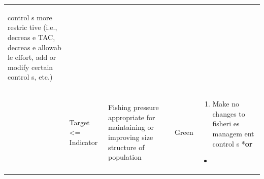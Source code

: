\documentclass[]{book}
\providecommand{\tightlist}{%
  \setlength{\itemsep}{0pt}\setlength{\parskip}{0pt}}
\begin{document}
\begin{longtable}[]{@{}lllll@{}}
\begin{minipage}[t]{0.19\columnwidth}
\begin{enumerate}
  control s more restric tive (i.e., decreas e TAC, decreas e allowab le
  effort, add or modify certain control s, etc.)
\end{enumerate}\strut
\end{minipage}\tabularnewline
\begin{minipage}[t]{0.19\columnwidth}\raggedright\strut
\strut
\end{minipage} & \begin{minipage}[t]{0.19\columnwidth}\raggedright\strut
Target \textless{}= Indicator\strut
\end{minipage} & \begin{minipage}[t]{0.19\columnwidth}\raggedright\strut
Fishing pressure appropriate for maintaining or improving size structure
of population\strut
\end{minipage} & \begin{minipage}[t]{0.19\columnwidth}\raggedright\strut
Green\strut
\end{minipage} & \begin{minipage}[t]{0.19\columnwidth}\raggedright\strut
\begin{enumerate}
\def\labelenumi{\arabic{enumi}.}
\tightlist
\item
  Make no changes to fisheri es managem ent control s *\textbf{or}
\end{enumerate}

\begin{itemize}
\item
\end{itemize}


\end{minipage}
\end{longtable}
\end{document}
